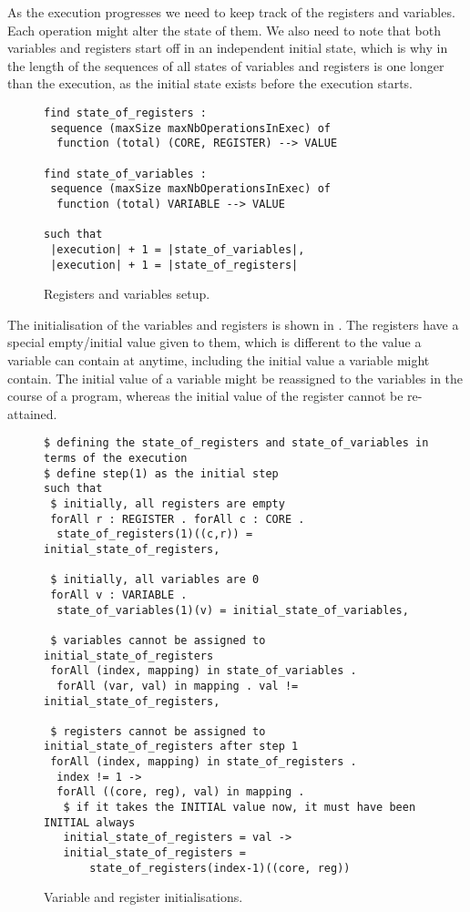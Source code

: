 \documentclass[runningheads]{llncs}
\begin{document}
As the execution progresses we need to keep track of the registers and variables.
Each operation might alter the state of them.
We also need to note that both variables and registers start off in an independent initial state, which is why in  the length of the sequences of all states of variables and registers is one longer than the execution, as the initial state exists before the execution starts.

\begin{figure}
\begin{lstlisting}
find state_of_registers :
 sequence (maxSize maxNbOperationsInExec) of
  function (total) (CORE, REGISTER) --> VALUE

find state_of_variables :
 sequence (maxSize maxNbOperationsInExec) of
  function (total) VARIABLE --> VALUE

such that
 |execution| + 1 = |state_of_variables|,
 |execution| + 1 = |state_of_registers|
\end{lstlisting}
\caption{Registers and variables setup. \label{fig:essence4}}
\end{figure}


The initialisation of the variables and registers is shown in .
The registers have a special empty/initial value given to them, which is different to the value a variable can contain at anytime, including the initial value a variable might contain.
The initial value of a variable might be reassigned to the variables in the course of a program, whereas the initial value of the register cannot be re-attained.

\begin{figure}[t]
\begin{lstlisting}
$ defining the state_of_registers and state_of_variables in terms of the execution
$ define step(1) as the initial step
such that
 $ initially, all registers are empty
 forAll r : REGISTER . forAll c : CORE .
  state_of_registers(1)((c,r)) = initial_state_of_registers,

 $ initially, all variables are 0
 forAll v : VARIABLE .
  state_of_variables(1)(v) = initial_state_of_variables,

 $ variables cannot be assigned to initial_state_of_registers
 forAll (index, mapping) in state_of_variables .
  forAll (var, val) in mapping . val != initial_state_of_registers,

 $ registers cannot be assigned to initial_state_of_registers after step 1
 forAll (index, mapping) in state_of_registers .
  index != 1 ->
  forAll ((core, reg), val) in mapping .
   $ if it takes the INITIAL value now, it must have been INITIAL always
   initial_state_of_registers = val ->
   initial_state_of_registers =
       state_of_registers(index-1)((core, reg))
\end{lstlisting}
\caption{Variable and register initialisations.\label{fig:essence-step1}}
\end{figure}
\end{document}

